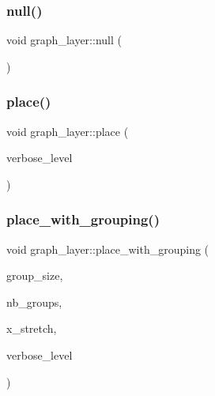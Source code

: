 \mbox{\label{classgraph__layer_acf0da08ee035ec4e75d754b9169700f2}} 
\subsubsection{\texorpdfstring{null()}{null()}}
{\footnotesize\ttfamily void graph\+\_\+layer\+::null (\begin{DoxyParamCaption}{ }\end{DoxyParamCaption})}

\mbox{\label{classgraph__layer_a24ae195b3ddbb86164b816db1ad2223a}} 
\subsubsection{\texorpdfstring{place()}{place()}}
{\footnotesize\ttfamily void graph\+\_\+layer\+::place (\begin{DoxyParamCaption}\item[{\mbox{\hyperlink{galois_8h_a09fddde158a3a20bd2dcadb609de11dc}{I\+NT}}}]{verbose\+\_\+level }\end{DoxyParamCaption})}

\mbox{\label{classgraph__layer_a3a75deb6bc8d38d369004528b3d06f76}} 
\subsubsection{\texorpdfstring{place\+\_\+with\+\_\+grouping()}{place\_with\_grouping()}}
{\footnotesize\ttfamily void graph\+\_\+layer\+::place\+\_\+with\+\_\+grouping (\begin{DoxyParamCaption}\item[{\mbox{\hyperlink{galois_8h_a09fddde158a3a20bd2dcadb609de11dc}{I\+NT}} $\ast$}]{group\+\_\+size,  }\item[{\mbox{\hyperlink{galois_8h_a09fddde158a3a20bd2dcadb609de11dc}{I\+NT}}}]{nb\+\_\+groups,  }\item[{double}]{x\+\_\+stretch,  }\item[{\mbox{\hyperlink{galois_8h_a09fddde158a3a20bd2dcadb609de11dc}{I\+NT}}}]{verbose\+\_\+level }\end{DoxyParamCaption})}

